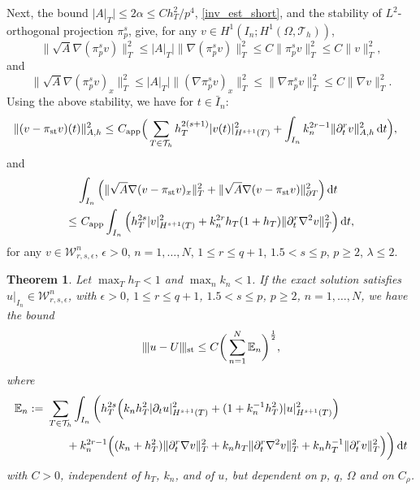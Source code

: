 \documentclass{amsart}
\newcommand{\norm}[2]{\|{#1}\|_{{#2}}}
\newcommand{\ud}{\,{\rm d}}
\newcommand{\su}{\sum_{T \in \Th}}
\newcommand{\Th}{\mathcal{T}_h}
\newcommand{\ndg}[1]{|\kern-.03cm \|{#1}|\kern-.03cm \|}
\newtheorem{theorem}{Theorem}[section]
\theoremstyle{definition}
\theoremstyle{remark}
\numberwithin{equation}{section}
\begin{document}
Next, %
the bound $|A|_{T}|\leq 2\alpha \le C {h_T^2/p^4}$, \eqref{inv_est_short}, and the stability of $L^2$-orthogonal projection $ \pi^s_p$, give, for any $v\in H^1(I_n;H^{1}(\Omega,\Th)) $,
\[
\norm{\sqrt{A} \nabla (\pi^s_p v)}{T}^2
\le   |A|_{T}| \norm{\nabla (\pi^s_p v)}{T}^2
\le C  \norm{\pi^s_p v}{T}^2
\le C  \norm{v}{T}^2,
\]
and
\[
\norm{\sqrt{A} \nabla (\pi^s_p v)_x}{T}^2
\le   |A|_{T}| \norm{(\nabla \pi^s_p v)_x}{T}^2
\le  \norm{\nabla \pi^s_p v}{T}^2
\le C  \norm{\nabla v}{T}^2.
\]
Using the above stability, we have for $t\in\bar{I}_n$:
\begin{equation}\label{eq:space_time_approximation new}
	\begin{aligned}
		\norm{(v-\pi_{\rm st}v)(t)}{A,h}^2
		\leq &\
		C_{\rm app} \Big(\su
		h_T^{2(s+1)}|v(t)|_{H^{s+1}(T)}^2
		+
		\int_{I_n}
		k_n^{2r-1} \|   \partial_t^r  v \|_{A,h}^2
		\ud t\Big),
	\end{aligned}
\end{equation}
and
\begin{equation}\label{eq:space_time_approximation new_new}
	\begin{aligned}
	& \int_{I_n}\Big( \norm{\sqrt{A}\nabla(v-\pi_{\rm st}v)_x}{T}^2+ \norm{ \sqrt{A}\nabla (v-\pi_{\rm st}v) }{\partial T}^2\Big)\ud t\\
		\leq &\
		C_{\rm app} \int_{I_n} \Big(
		h_T^{2s}|v|_{H^{s+1}(T)}^2
		+
		k_n^{2r}h_T(1+h_T)\|   \partial_t^r  \nabla^2 v \|_{T}^2
		\Big)\ud t,
	\end{aligned}
\end{equation}
for any $v\in\mathcal{W}_{r,s,\epsilon}^n$, $\epsilon>0$, $n=1,\dots,N$, $1\le r\le q+1$, $1.5< s\le p$, $p\geq2$, $\lambda\leq 2$.
\begin{theorem}
Let $\max_{T}h_T<1$ and $\max_{n}k_n<1$. If the exact solution satisfies $u|_{I_n}\in \mathcal{W}_{r,s,\epsilon}^n$, with $\epsilon>0$, $1\le r\le q+1$, $1.5< s\le p$, $p\geq2$, $n=1,\dots, N$, we have the bound
\begin{equation}\label{eqn: error bound in ST norm}
\begin{split}
	\ndg{u-U}_{\rm st} \leq C \bigg(\sum_{n = 1}^N \mathbb{E}_n\bigg)^{\frac12},
\end{split}
\end{equation}
where
\begin{equation*}
	\begin{aligned}
		\mathbb{E}_n := &\   \su \int_{I_n}\bigg(h_T^{2s}\Big( k_nh_T^2|\partial_t u|_{H^{s+1}(T)}^2+(1+k_n^{-1}h_T^2)|u|_{H^{s+1}(T)}^2\Big)
		\\
		&\qquad+
		k_n^{2r-1}\Big( (k_n+h_T^2) \norm{\partial_t^r \nabla v}{T}^2+k_nh_T\|   \partial_t^r  \nabla^2 v \|_{T}^2
+ k_n h_T^{-1}\norm{ \partial_t^r  v}{T}^2\Big)
		\bigg)\ud t
	\end{aligned}
\end{equation*}
with $C>0$, independent of $h_T$, $k_n$, and of $u$, but dependent on $p$, $q$, $\Omega$ and on $C_{\rho}$.
\end{theorem}
\end{document}
